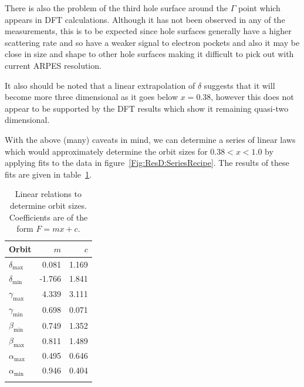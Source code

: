 There is also the problem of the third hole surface around the $\Gamma$ point which appears in \ac{DFT} calculations. Although it has not been observed in any of the measurements, this is to be expected since hole surfaces generally have a higher scattering rate and so have a weaker signal to electron pockets and also it may be close in size and shape to other hole surfaces making it difficult to pick out with current \ac{ARPES} resolution.


 It also should be noted that a linear extrapolation of $\delta$ suggests that it will become more three dimensional as it goes below $x=0.38$, however this does not appear to be supported by the \ac{DFT} results which show it remaining quasi-two dimensional. 

With the above (many) caveats in mind, we can determine a series of linear laws which would approximately determine the orbit sizes for $0.38 < x < 1.0$ by applying fits to the data in figure~\ref{Fig:ResD:SeriesRecipe}. The results of these fits are given in table~\ref{Table:ResD:SeriesRecipeFits}.
\begin{table}
    \begin{center}
           \caption{Linear relations to determine orbit sizes. Coefficients are of the form $F=mx+c$.}
        \begin{tabular}[htbp]{lrr}
\toprule
Orbit   & $m$   & $c$   \\
\midrule
$\delta_{\textrm{max}}$ & 0.081 & 1.169 \\
$\delta_{\textrm{min}}$ & -1.766 & 1.841 \\
$\gamma_{\textrm{max}}$ & 4.339 & 3.111 \\
$\gamma_{\textrm{min}}$ & 0.698 &  0.071 \\
$\beta_{\textrm{min}}$ & 0.749 & 1.352 \\
$\beta_{\textrm{max}}$ & 0.811 & 1.489 \\
$\alpha_{\textrm{max}}$ & 0.495 & 0.646 \\
$\alpha_{\textrm{min}}$ & 0.946 & 0.404 \\
\bottomrule
        \label{Table:ResD:SeriesRecipeFits}
        \end{tabular}
    \end{center}
\end{table}

